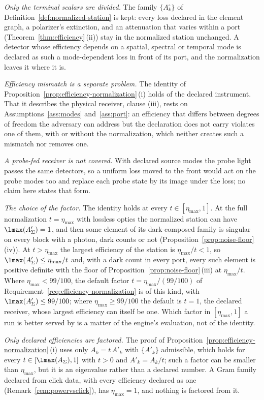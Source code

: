 \begin{remark}\label{rem:normalization-scope}
\emph{Only the terminal scalars are divided.} The family $\{A^{\circ}_k\}$ of
Definition~\ref{def:normalized-station} is kept: every loss declared in the
element graph, a polarizer's extinction, and an attenuation that varies
within a port (Theorem~\ref{thm:efficiency}\,(ii)) stay in the normalized
station unchanged. A detector whose efficiency depends on a spatial, spectral
or temporal mode is declared as such a mode-dependent loss in front of its
port, and the normalization leaves it where it is.

\emph{Efficiency mismatch is a separate problem.} The identity of
Proposition~\ref{prop:efficiency-normalization}\,(i) holds of the declared
instrument. That it describes the physical receiver, clause (iii), rests on
Assumptions~\ref{ass:modes} and~\ref{ass:port}: an efficiency that differs
between degrees of freedom the adversary can address but the declaration
does not carry violates one of them, with or without the normalization, which
neither creates such a mismatch nor removes one.

\emph{A probe-fed receiver is not covered.} With declared source modes the
probe light passes the same detectors, so a uniform loss moved to the front
would act on the probe modes too and replace each probe state by its image
under the loss; no claim here states that form.

\emph{The choice of the factor.} The identity holds at every
$t\in[\eta_{\max},1]$. At the full normalization $t=\eta_{\max}$ with lossless
optics the normalized station can have $\lmax(A'_\Sigma)=1$, and then some
element of its dark-composed family is singular on every block with a photon,
dark counts or not (Proposition~\ref{prop:noise-floor}\,(iv)). At
$t>\eta_{\max}$ the largest efficiency of the station is $\eta_{\max}/t<1$,
so $\lmax(A'_\Sigma)\le\eta_{\max}/t$ and, with a dark count in every port,
every such element is positive definite with the floor of
Proposition~\ref{prop:noise-floor}\,(iii) at $\eta_{\max}/t$. Where
$\eta_{\max}<99/100$, the default factor
$t=\eta_{\max}/(99/100)$ of Requirement~\ref{req:efficiency-normalization}
is of this kind, with $\lmax(A'_\Sigma)\le99/100$; where
$\eta_{\max}\ge99/100$ the default is $t=1$, the declared receiver, whose
largest efficiency can itself be one. Which factor in $[\eta_{\max},1]$ a run
is better served by is a matter of the engine's evaluation, not of the
identity.

\emph{Only declared efficiencies are factored.} The proof of
Proposition~\ref{prop:efficiency-normalization}\,(i) uses only $A_k=t\,A'_k$
with $\{A'_k\}$ admissible, which holds for every
$t\in[\lmax(A_\Sigma),1]$ with $t>0$ and $A'_k=A_k/t$; such a factor can be smaller
than $\eta_{\max}$, but it is an eigenvalue rather than a declared number.
A Gram family declared from click data, with every efficiency declared as one
(Remark~\ref{rem:powervsclick}), has $\eta_{\max}=1$, and nothing is factored
from it.
\end{remark}
